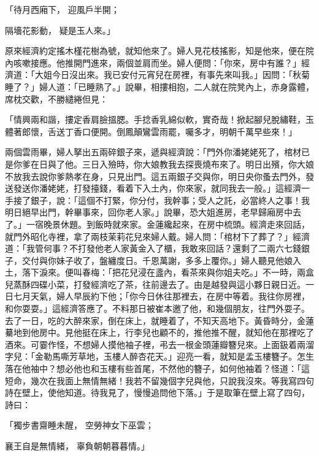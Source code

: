 \begin{showcontents}{}
「待月西廂下，  迎風戶半開；

隔墻花影動，  疑是玉人來。」

原來經濟約定搖木槿花樹為號，就知他來了。婦人見花枝搖影，知是他來，便在院內咳嗽接應。他推開門進來，兩個並肩而坐。婦人便問：「你來，房中有誰？」經濟道：「大姐今日沒出來。我已安付元宵兒在房裡，有事先來叫我。」因問：「秋菊睡了？」婦人道：「已睡熟了。」說畢，相摟相抱，二人就在院凳內上，赤身露體，席枕交歡，不勝繾綣但見：

「情興兩和諧，摟定香肩臉搵腮。手捻香乳綿似軟，實奇哉！掀起腳兒脫繡鞋，玉體著郎懷，舌送丁香口便開。倒鳳顛鸞雲雨罷，囑多才，明朝千萬早些來！」

兩個雲雨畢，婦人拏出五兩碎銀子來，遞與經濟說：「門外你潘姥姥死了，棺材已是你爹在日與了他。三日入殮時，你大娘教我去探喪燒布來了。明日出殯，你大娘不放我去說你爹熱孝在身，只見出門。這五兩銀子交與你，明日央你蚤去門外，發送發送你潘姥姥，打發擡錢，看着下入土內，你來家，就同我去一般。」這經濟一手接了銀子，說：「這個不打緊，你分付，我幹事；受人之託，必當終人之事！我明日絕早出門，幹畢事來，回你老人家。」說畢，恐大姐進房，老早歸廂房中去了。」一宿晚景休題。到飯時就來家。金蓮纔起來，在房中梳頭。經濟走來回話，就門外昭化寺裡，拿了兩枝茉莉花兒來婦人戴。婦人問：「棺材下了葬了？」經濟道：「我管何事？不打發他老人家黃金入了櫃，我敢來回話？還剩了二兩六七錢銀子，交付與你妹子收了，盤纏度日。千恩萬謝，多多上覆你。」婦人聽見他娘入土，落下淚來。便叫春梅：「把花兒浸在盞內，看茶來與你姐夫吃。」不一時，兩盒兒蒸酥四碟小菜，打發經濟吃了茶，往前邊去了。由是越發與這小夥日親日近。一日七月天氣，婦人早辰約下他；「你今日休往那裡去，在房中等着。我往你房裡，和你耍耍。」這經濟答應了。不料那日被崔本邀了他，和幾個朋友，往門外耍子。去了一日，吃的大醉來家，倒在床上，就睡着了，不知天高地下。黃昏時分，金蓮驀地到他房中。見他挺在床上，行李兒也顧不的，推他推不醒，就知他在那裡吃了酒來。可霎作怪，不想婦人摸他袖子裡，弔去一根金頭蓮瓣簪兒來。上面鈒着兩溜字兒：「金勒馬嘶芳草地，玉樓人醉杏花天。」迎亮一看，就知是孟玉樓簪子。怎生落在他袖中？想必他也和玉樓有些首尾，不然他的簪子，如何他袖着？怪道：「這短命，幾次在我面上無情無緒！我若不留幾個字兒與他，只說我沒來。等我寫四句詩在壁上，使他知道。待我見了，慢慢追問他下落。」于是取筆在壁上寫了四句，詩曰：

「獨步書齋睡未醒，  空勞神女下巫雲；

襄王自是無情緒，  辜負朝朝暮暮情。」


\end{showcontents}
